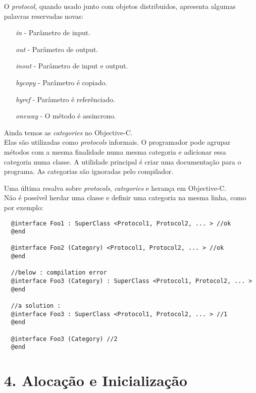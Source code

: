 \documentclass[brazil]{beamer}
\begin{document}
\begin{frame}
  O \textit{protocol}, quando usado junto com objetos distribuidos, apresenta algumas palavras reservadas novas:
  \begin{itemize}
    \item[\textit{in}] - Parâmetro de input.
    \item[\textit{out}] - Parâmetro de output.
    \item[\textit{inout}] - Parâmetro de input e output.
    \item[\textit{bycopy}] - Parâmetro é copiado.
    \item[\textit{byref}] - Parâmetro é referênciado.
    \item[\textit{oneway}] - O método é assincrono.
  \end{itemize}
\end{frame}

\begin{frame}
  Ainda temos as \textit{categories} no Objective-C. \\
  Elas são utilizadas como \textit{protocols} informais. O programador pode agrupar métodos com a mesma finalidade numa mesma categoria e adicionar essa categoria
  numa classe. A utilidade principal é criar uma documentação para o programa. As categorias são ignoradas pelo compilador.
\end{frame}

\begin{frame}[fragile]
  Uma última resalva sobre \textit{protocols}, \textit{categories} e herança em Objective-C. \\
  Não é possível herdar uma classe e definir uma categoria na mesma linha, como por exemplo:
  \lstset{language=C++,basicstyle=\scriptsize}
  \begin{lstlisting}
  @interface Foo1 : SuperClass <Protocol1, Protocol2, ... > //ok
  @end
  
  @interface Foo2 (Category) <Protocol1, Protocol2, ... > //ok
  @end
  
  //below : compilation error
  @interface Foo3 (Category) : SuperClass <Protocol1, Protocol2, ... >
  @end
  
  //a solution :
  @interface Foo3 : SuperClass <Protocol1, Protocol2, ... > //1
  @end
  
  @interface Foo3 (Category) //2
  @end
  \end{lstlisting}
\end{frame}

\section{4. Alocação e Inicialização}
\end{document}
